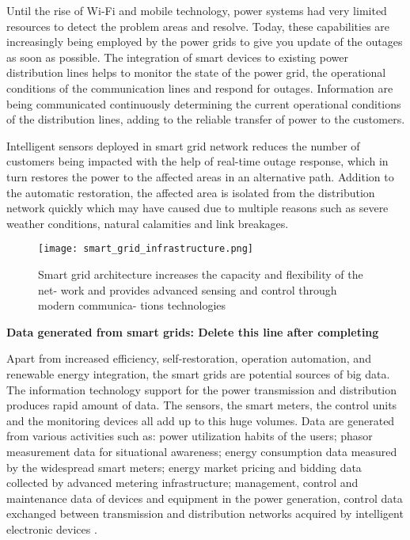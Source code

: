 Until the rise of Wi-Fi and mobile technology, power systems had very limited resources to detect the problem areas and resolve. Today, these capabilities are increasingly being employed by the power grids to give you update of the outages as soon as possible. The integration of smart devices to existing power distribution lines helps to monitor the state of the power grid, the operational conditions of the communication lines and respond for outages. Information are being communicated continuously determining the current operational conditions of the distribution lines, adding to the reliable transfer of power to the customers. 

Intelligent sensors deployed in smart grid network reduces the number of customers being impacted with the help of real-time outage response, which in turn restores the power to the affected areas in an alternative path. Addition to the automatic restoration, the affected area is isolated from the distribution network quickly which may have caused due to multiple reasons such as severe weather conditions, natural calamities and link breakages. 


\begin{figure}
\centerline{\texttt{[image: smart\_grid\_infrastructure.png]}}
    \caption{Smart grid architecture increases the capacity and flexibility of the net- work and provides advanced sensing and control through modern communica- tions technologies \cite{gungor2011smart}}
    \label{fig:mesh}
\end{figure}

\textbf{Data generated from smart grids: Delete this line after completing}

Apart from increased efficiency, self-restoration, operation automation, and renewable energy integration, the smart grids are potential sources of big data. The information technology support for the power transmission and distribution produces rapid amount of data. The sensors, the smart meters, the control units and the monitoring devices all add up to this huge volumes. Data are generated from various activities such as: power utilization habits of the users; phasor measurement data for situational awareness; energy consumption data measured by the widespread smart meters; energy market pricing and bidding data collected by advanced metering infrastructure; management, control and maintenance data of devices and equipment in the power generation, control data exchanged between transmission and distribution networks acquired by intelligent electronic devices \cite{lai2015big}. 

